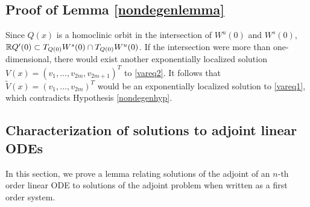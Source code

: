 \documentclass[thesis.tex]{subfiles}
\begin{document}
\subsection{Proof of Lemma \ref{nondegenlemma}}
Since $Q(x)$ is a homoclinic orbit in the intersection of $W^u(0)$ and $W^s(0)$, ${\mathbb R} Q'(0) \subset T_{Q(0)}W^s(0) \cap T_{Q(0)}W^u(0)$. If the intersection were more than one-dimensional, there would exist another exponentially localized solution $V(x) = (v_1, \dots, v_{2m}, v_{2m+1})^T$ to \eqref{vareq2}. It follows that $\tilde{V}(x) = (v_1, \dots, v_{2m})^T$ would be an exponentially localized solution to \eqref{vareq1}, which contradicts Hypothesis \ref{nondegenhyp}.

\subsection{Characterization of solutions to adjoint linear ODEs}

In this section, we prove a lemma relating solutions of the adjoint of an $n$-th order linear ODE to solutions of the adjoint problem when written as a first order system.
\end{document}
